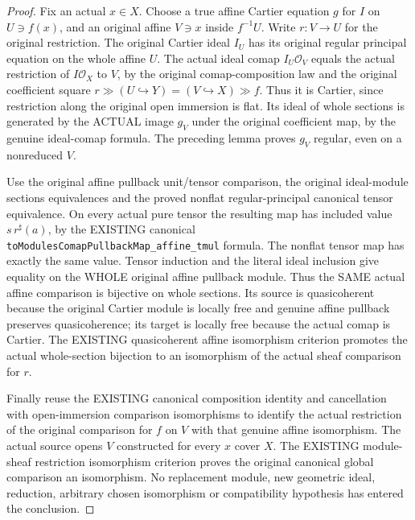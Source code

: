 \begin{proof}
Fix an actual $x\in X$. Choose a true affine Cartier equation $g$ for $I$
on $U\ni f(x)$, and an original affine $V\ni x$ inside $f^{-1}U$.
Write $r:V\to U$ for the original restriction. The original Cartier ideal
$I_U$ has its original regular principal equation on the whole affine $U$.
The actual ideal comap $I_U\mathcal O_V$ equals the actual restriction
of $I\mathcal O_X$ to $V$, by the original comap-composition law and
the original coefficient square
$r\gg(U\hookrightarrow Y)=(V\hookrightarrow X)\gg f$.
Thus it is Cartier, since restriction along the original open immersion
is flat. Its ideal of whole sections is generated by the ACTUAL image
$g_V$ under the original coefficient map, by the genuine ideal-comap formula.
The preceding lemma proves $g_V$ regular, even on a nonreduced $V$.

Use the original affine pullback unit/tensor comparison, the original
ideal-module sections equivalences and the proved nonflat regular-principal
canonical tensor equivalence. On every actual pure tensor the resulting
map has included value $s\,r^\sharp(a)$, by the EXISTING canonical
\texttt{toModulesComapPullbackMap\_affine\_tmul} formula. The nonflat tensor
map has exactly the same value. Tensor induction and the literal ideal
inclusion give equality on the WHOLE original affine pullback module.
Thus the SAME actual affine comparison is bijective on whole sections.
Its source is quasicoherent because the original Cartier module is
locally free and genuine affine pullback preserves quasicoherence; its
target is locally free because the actual comap is Cartier. The EXISTING
quasicoherent affine isomorphism criterion promotes the actual whole-section
bijection to an isomorphism of the actual sheaf comparison for $r$.

Finally reuse the EXISTING canonical composition identity and cancellation
with open-immersion comparison isomorphisms to identify the actual
restriction of the original comparison for $f$ on $V$ with that genuine
affine isomorphism. The actual source opens $V$ constructed for every
$x$ cover $X$. The EXISTING module-sheaf restriction isomorphism criterion
proves the original canonical global comparison an isomorphism.
No replacement module, new geometric ideal, reduction, arbitrary chosen
isomorphism or compatibility hypothesis has entered the conclusion.
\end{proof}

